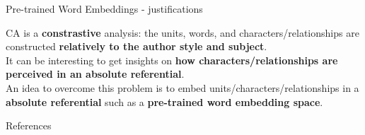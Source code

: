 \documentclass[10pt]{beamer}
\newcommand{\imp}[1]{\textbf{\color{cyan}#1}}
\begin{document}
	
	\begin{frame}{Pre-trained Word Embeddings - justifications}
		
		CA is a \imp{constrastive} analysis: the units, words, and characters/relationships are constructed \imp{relatively to the author style and subject}. \\
		\vspace{0.4cm}
		It can be interesting to get insights on \imp{how characters/relationships are perceived in an absolute referential}. \\
		\vspace{0.4cm}
		An idea to overcome this problem is to embed units/characters/relationships in a \imp{absolute referential} such as a \imp{pre-trained word embedding space}.
		
	\end{frame}
	
	
	
	\appendix
	
	\begin{frame}[shrink=40, fragile]{References}
		\begin{multicols}{2}
			
			
		\end{multicols}
	\end{frame}
	
\end{document}
